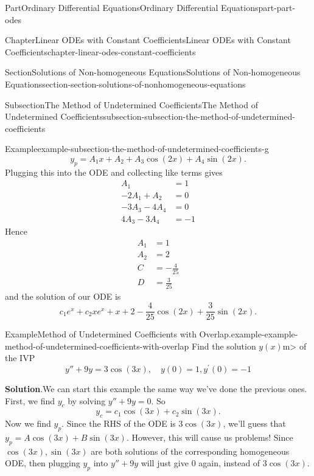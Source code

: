 \documentclass[twoside,10pt,]{book}
\newcommand{\blocktitlefont}{\relax}
\numberwithin{equation}{part}
\begin{document}
\begin{partptx}{Part}{Ordinary Differential Equations}{}{Ordinary Differential Equations}{}{}{part-part-odes}
\begin{chapterptx}{Chapter}{Linear ODEs with Constant Coefficients}{}{Linear ODEs with Constant Coefficients}{}{}{chapter-linear-odes-constant-coefficients}
\begin{sectionptx}{Section}{Solutions of Non-homogeneous Equations}{}{Solutions of Non-homogeneous Equations}{}{}{section-section-solutions-of-nonhomogeneous-equations}
\begin{subsectionptx}{Subsection}{The Method of Undetermined Coefficients}{}{The Method of Undetermined Coefficients}{}{}{subsection-subsection-the-method-of-undetermined-coefficients}
\begin{example}{Example}{}{example-subsection-the-method-of-undetermined-coefficients-g}
\begin{equation*}
y_{p} = A_{1}x + A_{2} + A_{3}\cos(2x) + A_{4}\sin(2x).
\end{equation*}
Plugging this into the ODE and collecting like terms gives%
\begin{align*}
A_{1} & = 1\\
-2A_{1} + A_{2} & = 0\\
-3A_{3} - 4A_{4} & = 0\\
4A_{3} - 3A_{4} & = -1
\end{align*}
Hence%
\begin{align*}
A_{1} & = 1 \\
A_{2} & = 2 \\
C & = -\frac{4}{25} \\
D & = \frac{3}{25} 
\end{align*}
and the solution of our ODE is%
\begin{equation*}
c_{1}e^{x} + c_{2}xe^{x} + x + 2 - \frac{4}{25}\cos(2x) + \frac{3}{25}\sin(2x).
\end{equation*}
%
\end{example}
\begin{example}{Example}{Method of Undetermined Coefficients with Overlap.}{example-example-method-of-undetermined-coefficients-with-overlap}%
Find the solution \(y(x)\)m\textgreater{} of the IVP%
\begin{equation*}
y''+9y = 3\cos(3x),\quad y(0) = 1,y^\prime(0) = -1
\end{equation*}
%
\par\smallskip%
\noindent\textbf{\blocktitlefont Solution}.\hypertarget{solution-example-method-of-undetermined-coefficients-with-overlap-c}{}\quad{}We can start this example the same way we've done the previous ones. First, we find \(y_{c}\) by solving \(y''+9y=0\). So%
\begin{equation*}
y_{c} = c_{1}\cos(3x)+c_{2}\sin(3x).
\end{equation*}
Now we find \(y_{p}\). Since the RHS of the ODE is \(3\cos(3x)\), we'll guess that \(y_{p} = A\cos(3x)+B\sin(3x)\). However, this will cause us problems! Since \(\cos(3x),\sin(3x)\) are both solutions of the corresponding homogeneous ODE, then plugging \(y_{p}\) into \(y''+9y\) will just give \(0\) again, instead of \(3\cos(3x)\).%
\par

\end{example}
\end{subsectionptx}
\end{sectionptx}
\end{chapterptx}
\end{partptx}
\end{document}
